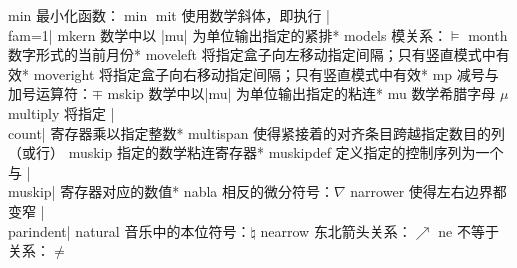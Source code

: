 \capcs min {最小化函数：$\min$}{}{}
\capcs mit {使用数学斜体，即执行 |\\fam=1|}{}{}
\capcs mkern {数学中以 |mu| 为单位输出指定的紧排}*{}
\capcs models {模关系：$\models$}{}{}
\capcs month {数字形式的当前月份}*{}
\capcs moveleft {将指定盒子向左移动指定间隔；只有竖直模式中有效}*{}
\capcs moveright {将指定盒子向右移动指定间隔；只有竖直模式中有效}*{}
\capcs mp {减号与加号运算符：$\mp$}{}{}
\capcs mskip {数学中以|mu| 为单位输出指定的粘连}*{}
\capcs mu {数学希腊字母 $\mu$}{}{}
\capcs multiply {将指定 |\\count| 寄存器乘以指定整数}*{}
\capcs multispan {使得紧接着的对齐条目跨越指定数目的列（或行）}{}{}
\capcs muskip {指定的数学粘连寄存器}*{}
\capcs muskipdef {定义指定的控制序列为一个与 |\\muskip| 寄存器对应的数值}*{}
\capcs nabla {相反的微分符号：$\nabla$}{}{}
\capcs narrower {使得左右边界都变窄 |\\parindent|}{}{}
\capcs natural {音乐中的本位符号：$\natural$}{}{}
\capcs nearrow {东北箭头关系：$\nearrow$}{}{}
\capcs ne {不等于关系：$\ne$}{}{}
